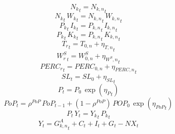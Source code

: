\noindent[name= `aggregate sector labour']
\begin{dmath}
{{N_k}}_{t}={{N_{k,n}}}_{t}
\end{dmath}
\noindent[name= `aggregate sector labour']
\begin{dmath}
{{N_k}}_{t}\, {{W_k}}_{t}={{N_{k,n}}}_{t}\, {{W_{k,n}}}_{t}
\end{dmath}
\noindent[name= `aggregate sector investment']
\begin{dmath}
{{P_k}}_{t}\, {{I_k}}_{t}={{P_{k,n}}}_{t}\, {{I_{k,n}}}_{t}
\end{dmath}
\noindent[name= `aggregate capital']
\begin{dmath}
{{P_k}}_{t}\, {{K_k}}_{t}={{P_{k,n}}}_{t}\, {{K_{k,n}}}_{t}
\end{dmath}
\noindent[name= `temperature']
\begin{dmath}
{{T_{r}}}_{t}={{T_{0,n}}}+{{\eta_{T,n}}}_{t}
\end{dmath}
\noindent[name= `wind speed']
\begin{dmath}
{{W_{r}^{S}}}_{t}={{W^{S}_{0,n}}}+{{\eta_{W^{S},n}}}_{t}
\end{dmath}
\noindent[name= `percipitation']
\begin{dmath}
{{PERC_{r}}}_{t}={{PERC_{0,n}}}+{{\eta_{PERC,n}}}_{t}
\end{dmath}
\noindent[name= `sea level']
\begin{dmath}
{{SL}}_{t}={{SL_0}}+{{\eta_{SL}}}_{t}
\end{dmath}
\noindent[name= `national price level']
\begin{dmath}
{P}_{t}={{P_0}}\, \exp\left({{\eta_{P}}}_{t}\right)
\end{dmath}
\noindent[name= `population']
\begin{dmath}
{PoP}_{t}={{\rho^{PoP}}}\, {PoP}_{t-1}+\left(1-{{\rho^{PoP}}}\right)\, {{POP_0}}\, \exp\left({{\eta_{PoP}}}_{t}\right)
\end{dmath}
\noindent[name= `aggregate gross value added']
\begin{dmath}
{P}_{t}\, {Y}_{t}={{Y_k}}_{t}\, {{P_k}}_{t}
\end{dmath}
\noindent[name= `resource constraint']
\begin{dmath}
{Y}_{t}={{G^{A}_{k,n}}}_{t}+{C}_{t}+{I}_{t}+{G}_{t}-{NX}_{t}
\end{dmath}
\noindent[name= `net exports']
